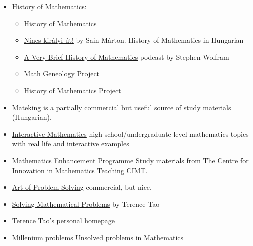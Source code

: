 \documentclass{article}
\begin{document}
\begin{itemize}
    \item History of Mathematics:
    \begin{itemize}
        \item \href{https://www.goodreads.com/book/show/786570.A_History_of_Mathematics}{History of Mathematics}
        \item \href{https://mek.oszk.hu/05000/05052/}{Nincs királyi út!} by Sain Márton. History of Mathematics in Hungarian
        \item \href{https://soundcloud.com/stephenwolfram/a-very-brief-history-of-mathematics}{A Very Brief History of Mathematics} podcast by Stephen Wolfram
        \item \href{https://genealogy.math.ndsu.nodak.edu/index.php}{Math Geneology Project}
        \item \href{https://history-of-mathematics.org/}{History of Mathematics Project}
    \end{itemize}
    
    
    
    
    
    
    
    \item \href{https://www.mateking.hu/}{Mateking} is a partially commercial but useful source of study materials (Hungarian).
    
    \item \href{https://www.intmath.com/}{Interactive Mathematics} high school/undergraduate level mathematics topics with real life and interactive examples 
    
    \item \href{http://www.cimt.org.uk/projects/mep/index.htm}{Mathematics Enhancement Programme} Study materials from The Centre for Innovation in Mathematics Teaching \href{http://www.cimt.org.uk/}{CIMT}.
    
    \item \href{https://artofproblemsolving.com/online}{Art of Problem Solving} commercial, but nice.
    
    \item \href{https://www.goodreads.com/book/show/265415.Solving_Mathematical_Problems}{Solving Mathematical Problems} by Terence Tao
    
    \item \href{https://terrytao.wordpress.com/}{Terence Tao}'s personal homepage
    
    \item \href{http://www.claymath.org/millennium-problems}{Millenium problems} Unsolved problems in Mathematics
    

\end{itemize}
\end{document}
